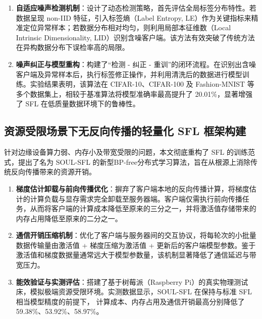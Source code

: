 \begin{enumerate}[label=\arabic*.]
    \item \textbf{自适应噪声检测机制}：设计了动态检测策略，首先评估全局标签分布特性。若数据呈现 non-IID 特征，引入标签熵（Label Entropy, LE）作为关键指标来精准定位异常样本；若数据分布相对均匀，则利用局部本征维数（Local Intrinsic Dimensionality, LID）识别含噪客户端。该方法有效突破了传统方法在异构数据分布下误检率高的局限。
    
    \item \textbf{噪声纠正与模型重构}：构建了“检测 - 纠正 - 重训”的闭环流程。在识别出含噪客户端及异常样本后，执行标签修正操作，并利用清洗后的数据进行模型训练。实验结果表明，该算法在 CIFAR-10、CIFAR-100 及 Fashion-MNIST 等多个数据集上，相较于基准算法将模型准确率最高提升了 20.01\%，显著增强了 SFL 在低质量数据环境下的鲁棒性。
\end{enumerate}

\subsection{资源受限场景下无反向传播的轻量化 SFL 框架构建}

针对边缘设备算力弱、内存小及带宽受限的问题，本文彻底重构了 SFL 的训练范式，提出了名为 SOUL-SFL 的新型BP-free分布式学习算法，旨在从根源上消除传统反向传播带来的资源开销。

\begin{enumerate}[label=\arabic*.]
    \item \textbf{梯度估计卸载与前向传播优化}：摒弃了客户端本地的反向传播计算，将梯度估计的计算负载与显存需求完全卸载至服务器端。客户端仅需执行前向传播任务，从而将客户端的计算成本降低至原来的三分之一，并将激活值存储带来的内存占用降低至原来的二分之一。
    
    \item \textbf{通信开销压缩机制}：优化了客户端与服务器间的交互协议，将每轮次的小批量数据传输量由激活值 + 梯度压缩为激活值 + 更新后的客户端模型参数。鉴于激活值和梯度数据量通常远大于模型参数量，该机制显著降低了通信延迟与带宽压力。
    
    \item \textbf{能效验证与实测评估}：搭建了基于树莓派（Raspberry Pi）的真实物理测试床，模拟极端资源受限环境。实测数据显示，SOUL-SFL 在保持与标准 SFL 相当模型精度的前提下， 计算成本、内存占用及通信开销最高分别降低了59.38\%、53.92\%、58.97\%。
\end{enumerate}

